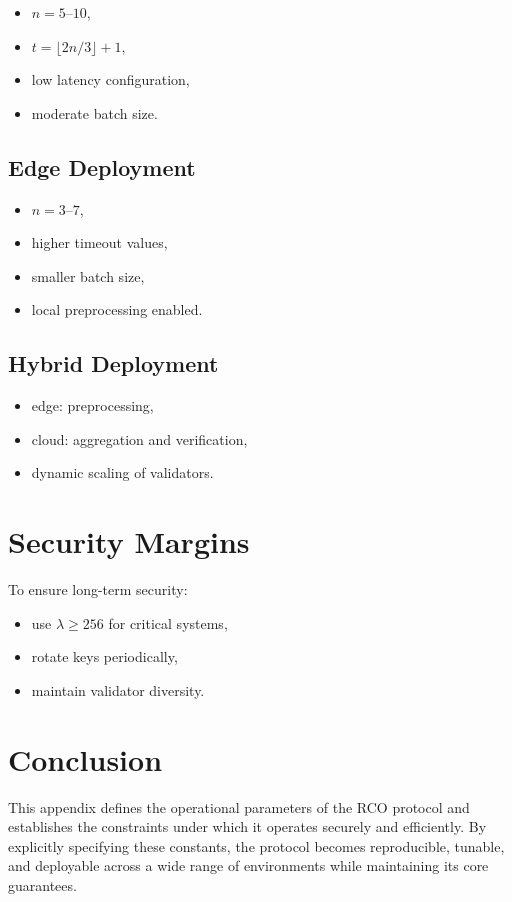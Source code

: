 \begin{itemize}
\item $n = 5$–$10$,
\item $t = \lfloor 2n/3 \rfloor + 1$,
\item low latency configuration,
\item moderate batch size.
\end{itemize}

\subsection{Edge Deployment}

\begin{itemize}
\item $n = 3$–$7$,
\item higher timeout values,
\item smaller batch size,
\item local preprocessing enabled.
\end{itemize}

\subsection{Hybrid Deployment}

\begin{itemize}
\item edge: preprocessing,
\item cloud: aggregation and verification,
\item dynamic scaling of validators.
\end{itemize}

\section{Security Margins}

To ensure long-term security:

\begin{itemize}
\item use $\lambda \geq 256$ for critical systems,
\item rotate keys periodically,
\item maintain validator diversity.
\end{itemize}

\section{Conclusion}

This appendix defines the operational parameters of the RCO protocol and establishes the constraints under which it operates securely and efficiently. By explicitly specifying these constants, the protocol becomes reproducible, tunable, and deployable across a wide range of environments while maintaining its core guarantees.